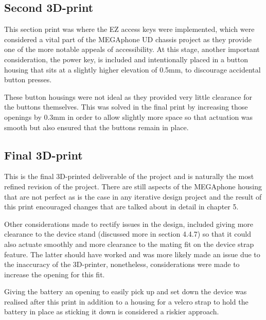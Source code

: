 \subsection{Second 3D-print}

This section print was where the EZ access keys were implemented, which were considered a vital part of the MEGAphone UD chassis project as they provide one of the more notable appeals of accessibility.
At this stage, another important consideration, the power key, is included and intentionally placed in a button housing that sits at a slightly higher elevation of 0.5mm, to discourage accidental button presses.

These button housings were not ideal as they provided very little clearance for the buttons themselves.
This was solved in the final print by increasing those openings by 0.3mm in order to allow slightly more space so that actuation was smooth but also ensured that the buttons remain in place.

\subsection{Final 3D-print}

This is the final 3D-printed deliverable of the project and is naturally the most refined revision of the project. 
There are still aspects of the MEGAphone housing that are not perfect as is the case in any iterative design project and the result of this print encouraged changes that are talked about in detail in chapter 5.

Other considerations made to rectify issues in the design, included giving more clearance to the device stand (discussed more in section 4.4.7) so that it could also actuate smoothly and more clearance to the mating fit on the device strap feature.
The latter should have worked and was more likely made an issue due to the inaccuracy of the 3D-printer, nonetheless, considerations were made to increase the opening for this fit.

Giving the battery an opening to easily pick up and set down the device was realised after this print in addition to a housing for a velcro strap to hold the battery in place as sticking it down is considered a riskier approach.

